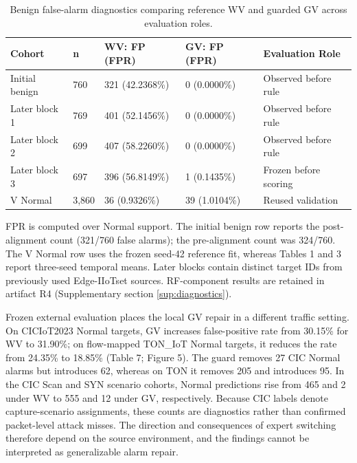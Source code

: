 \documentclass[final,3p,10pt,nopreprintline]{elsarticle}
\begin{document}
\begin{table}[H]\centering\small\setlength{\tabcolsep}{3pt}\renewcommand{\arraystretch}{1.13}
\caption{Benign false-alarm diagnostics comparing reference WV and guarded GV across evaluation roles.}\label{tab:guard_fpr}
\begin{tabular}{L{0.2\dimexpr{}\tabcolsep\relax}L{0.08\dimexpr{}\tabcolsep\relax}L{0.22\dimexpr{}\tabcolsep\relax}L{0.22\dimexpr{}\tabcolsep\relax}L{0.28\dimexpr{}\tabcolsep\relax}}\toprule
\textbf{Cohort} & \textbf{n} & \textbf{WV: FP (FPR)} & \textbf{GV: FP (FPR)} & \textbf{Evaluation Role}\\\midrule
Initial benign & 760 & 321 (42.2368\%) & 0 (0.0000\%) & Observed before rule\\
Later block 1 & 769 & 401 (52.1456\%) & 0 (0.0000\%) & Observed before rule\\
Later block 2 & 699 & 407 (58.2260\%) & 0 (0.0000\%) & Observed before rule\\
Later block 3 & 697 & 396 (56.8149\%) & 1 (0.1435\%) & Frozen before scoring\\
V Normal & 3,860 & 36 (0.9326\%) & 39 (1.0104\%) & Reused validation\\
\bottomrule\end{tabular}
\end{table}

FPR is computed over Normal support. The initial benign row reports the post-alignment count (321/760 false alarms); the pre-alignment count was 324/760. The V Normal row uses the frozen seed-42 reference fit, whereas Tables 1 and 3 report three-seed temporal means. Later blocks contain distinct target IDs from previously used Edge-IIoTset sources. RF-component results are retained in artifact R4 (Supplementary section \ref*{sup:diagnostics}).

Frozen external evaluation places the local GV repair in a different traffic setting. On CICIoT2023 Normal targets, GV increases false-positive rate from 30.15\% for WV to 31.90\%; on flow-mapped TON\_IoT Normal targets, it reduces the rate from 24.35\% to 18.85\% (Table 7; Figure 5). The guard removes 27 CIC Normal alarms but introduces 62, whereas on TON it removes 205 and introduces 95. In the CIC Scan and SYN scenario cohorts, Normal predictions rise from 465 and 2 under WV to 555 and 12 under GV, respectively. Because CIC labels denote capture-scenario assignments, these counts are diagnostics rather than confirmed packet-level attack misses. The direction and consequences of expert switching therefore depend on the source environment, and the findings cannot be interpreted as generalizable alarm repair.
\end{document}
